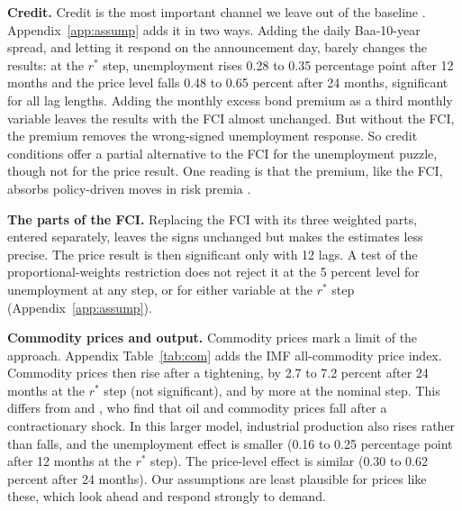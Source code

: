 \documentclass[11pt]{article}
\newcommand{\rs}{r^{*}}
\begin{document}
\textbf{Credit.} Credit is the most important channel we leave out of the baseline \citep{gilchrist2012,caldara2019}. Appendix~\ref{app:assump} adds it in two ways. Adding the daily Baa-10-year spread, and letting it respond on the announcement day, barely changes the results: at the $\rs$ step, unemployment rises 0.28 to 0.35 percentage point after 12 months and the price level falls 0.48 to 0.65 percent after 24 months, significant for all lag lengths. Adding the monthly excess bond premium as a third monthly variable leaves the results with the FCI almost unchanged. But without the FCI, the premium removes the wrong-signed unemployment response. So credit conditions offer a partial alternative to the FCI for the unemployment puzzle, though not for the price result. One reading is that the premium, like the FCI, absorbs policy-driven moves in risk premia \citep{bauer2026}.

\textbf{The parts of the FCI.} Replacing the FCI with its three weighted parts, entered separately, leaves the signs unchanged but makes the estimates less precise. The price result is then significant only with 12 lags. A test of the proportional-weights restriction does not reject it at the 5 percent level for unemployment at any step, or for either variable at the $\rs$ step (Appendix~\ref{app:assump}).

\textbf{Commodity prices and output.} Commodity prices mark a limit of the approach. Appendix Table~\ref{tab:com} adds the IMF all-commodity price index. Commodity prices then rise after a tightening, by 2.7 to 7.2 percent after 24 months at the $\rs$ step (not significant), and by more at the nominal step. This differs from \citet{boehm2026} and \citet{bauer2026}, who find that oil and commodity prices fall after a contractionary shock. In this larger model, industrial production also rises rather than falls, and the unemployment effect is smaller (0.16 to 0.25 percentage point after 12 months at the $\rs$ step). The price-level effect is similar (0.30 to 0.62 percent after 24 months). Our assumptions are least plausible for prices like these, which look ahead and respond strongly to demand.
\end{document}

